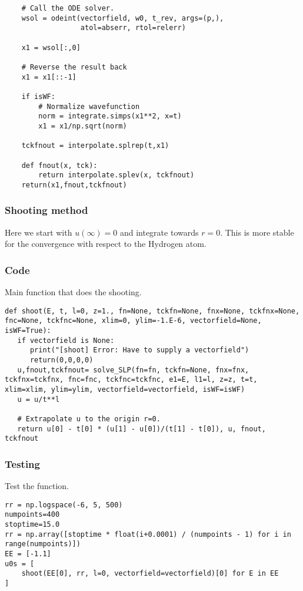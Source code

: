 \documentclass[11pt,a4paper]{article}
\begin{document}
\begin{enumerate}
\begin{verbatim}
    # Call the ODE solver.
    wsol = odeint(vectorfield, w0, t_rev, args=(p,),
                  atol=abserr, rtol=relerr)

    x1 = wsol[:,0]

    # Reverse the result back
    x1 = x1[::-1]

    if isWF:
        # Normalize wavefunction
        norm = integrate.simps(x1**2, x=t)
        x1 = x1/np.sqrt(norm)

    tckfnout = interpolate.splrep(t,x1)

    def fnout(x, tck):
        return interpolate.splev(x, tckfnout)
    return(x1,fnout,tckfnout)
\end{verbatim}
\end{enumerate}

\subsubsection{Shooting method}
\label{sec:org3ba1fb2}

Here we start with \(u(\infty)=0\) and integrate towards
\(r=0\). This is more stable for the convergence with
respect to the Hydrogen atom.

\subsubsection{Code}
\label{sec:orgc7bd29f}
Main function that does the shooting.
\begin{verbatim}
def shoot(E, t, l=0, z=1., fn=None, tckfn=None, fnx=None, tckfnx=None, fnc=None, tckfnc=None, xlim=0, ylim=-1.E-6, vectorfield=None, isWF=True):
   if vectorfield is None:
      print("[shoot] Error: Have to supply a vectorfield")
      return(0,0,0,0)
   u,fnout,tckfnout= solve_SLP(fn=fn, tckfn=None, fnx=fnx, tckfnx=tckfnx, fnc=fnc, tckfnc=tckfnc, e1=E, l1=l, z=z, t=t, xlim=xlim, ylim=ylim, vectorfield=vectorfield, isWF=isWF)
   u = u/t**l

   # Extrapolate u to the origin r=0.
   return u[0] - t[0] * (u[1] - u[0])/(t[1] - t[0]), u, fnout, tckfnout
\end{verbatim}

\subsubsection{Testing}
\label{sec:org67d321b}
Test the function.
\begin{verbatim}
rr = np.logspace(-6, 5, 500)
numpoints=400
stoptime=15.0
rr = np.array([stoptime * float(i+0.0001) / (numpoints - 1) for i in range(numpoints)])
EE = [-1.1]
u0s = [
    shoot(EE[0], rr, l=0, vectorfield=vectorfield)[0] for E in EE
]

\end{verbatim}
\end{document}
